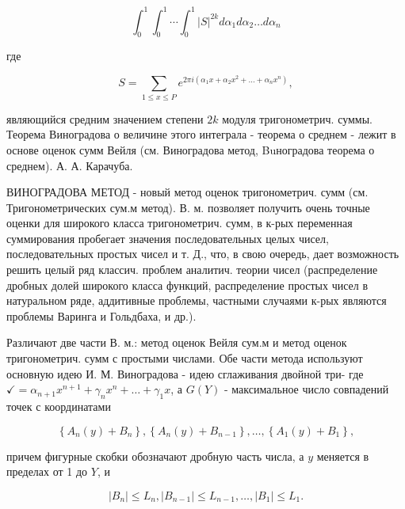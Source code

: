 \documentclass[10pt]{article}
\begin{document}
\[

\int_{0}^{1} \int_{0}^{1} \cdots \int_{0}^{1}|S|^{2 k} d \alpha_{1} d \alpha_{2} \ldots d \alpha_{n}

\]



где



\[

S=\sum_{1 \leqslant x \leqslant P} e^{2 \pi i\left(\alpha_{1} x+\alpha_{2} x^{2}+\ldots+\alpha_{n} x^{n}\right)},

\]



являющийся средним значением степени $2 k$ модуля тригонометрич. суммы. Теорема Виноградова о величине этого интеграла - теорема о среднем - лежит в основе оценок сумм Вейля (см. Виноградова метод, Buноградова теорема о среднем). А. А. Карачуба.



ВИНОГРАДОВА МЕТОД - новый метод оценок тригонометрич. сумм (см. Тригонометрических сум.м метод). В. м. позволяет получить очень точные оценки для широкого класса тригонометрич. сумм, в к-рых переменная суммирования пробегает значения последовательных целых чисел, последовательных простых чисел и т. Д., что, в свою очередь, дает возможность решить целый ряд классич. проблем аналитич. теории чисел (распределение дробных долей широкого класса функций, распределение простых чисел в натуральном ряде, аддитивные проблемы, частными случаями к-рых являются проблемы Варинга и Гольдбаха, и др.).



Различают две части В. м.: метод оценок Вейля сум.м и метод оценок тригонометрич. сумм с простыми числами. Обе части метода используют основную идею И. М. Виноградова - идею сглаживания двойной три- где $\checkmark=\alpha_{n+1} x^{n+1}+\gamma_{n} x^{n}+\ldots+\gamma_{1} x$, а $G(Y)$ - максимальное число совпадений точек с координатами



\[

\left\{A_{n}(y)+B_{n}\right\},\left\{A_{n}(y)+B_{n-1}\right\}, \ldots,\left\{A_{1}(y)+B_{1}\right\},

\]



причем фигурные скобки обозначают дробную часть числа, а $y$ меняется в пределах от 1 до $Y$, и



\[

\left|B_{n}\right| \leqslant L_{n},\left|B_{n-1}\right| \leqslant L_{n-1}, \ldots,\left|B_{1}\right| \leqslant L_{1} .

\]
\end{document}
